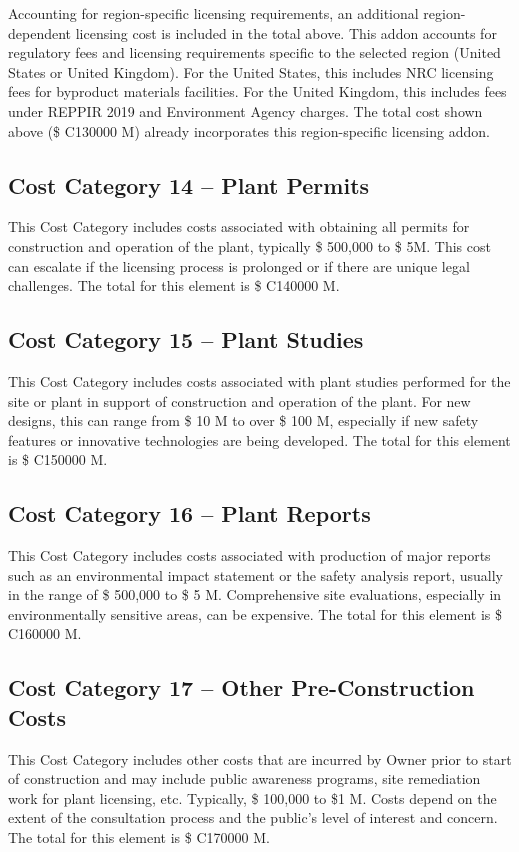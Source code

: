 \ifsafetycosts
Accounting for region-specific licensing requirements, an additional region-dependent licensing cost is included in the total above. This addon accounts for regulatory fees and licensing requirements specific to the selected region (United States or United Kingdom). For the United States, this includes NRC licensing fees for byproduct materials facilities. For the United Kingdom, this includes fees under REPPIR 2019 and Environment Agency charges. The total cost shown above (\$ C130000 M) already incorporates this region-specific licensing addon.
\fi

\subsection*{Cost Category 14 – Plant Permits} 
This Cost Category includes costs associated with obtaining all permits for construction and operation of the plant, typically \$ 500,000 to \$ 5M. This cost can escalate if the licensing process is prolonged or if there are unique legal challenges.  The total for this element is \$ C140000 M.

\subsection*{Cost Category 15 – Plant Studies} 
This Cost Category includes costs associated with plant studies performed for the site or plant in support of construction and operation of the plant. For new designs, this can range from \$ 10 M to over \$ 100 M, especially if new safety features or innovative technologies are being developed.  The total for this element is \$ C150000 M.

\subsection*{Cost Category 16 – Plant Reports} 
This Cost Category includes costs associated with production of major reports such as an environmental impact statement or the safety analysis report, usually in the range of \$ 500,000 to \$ 5 M. Comprehensive site evaluations, especially in environmentally sensitive areas, can be expensive. The total for this element is \$ C160000 M.

\subsection*{Cost Category 17 – Other Pre-Construction Costs} 
This Cost Category includes other costs that are incurred by Owner prior to start of construction and may include public awareness programs, site remediation work for plant licensing, etc. Typically, \$ 100,000 to \$1 M. Costs depend on the extent of the consultation process and the public's level of interest and concern.  The total for this element is \$ C170000 M.

